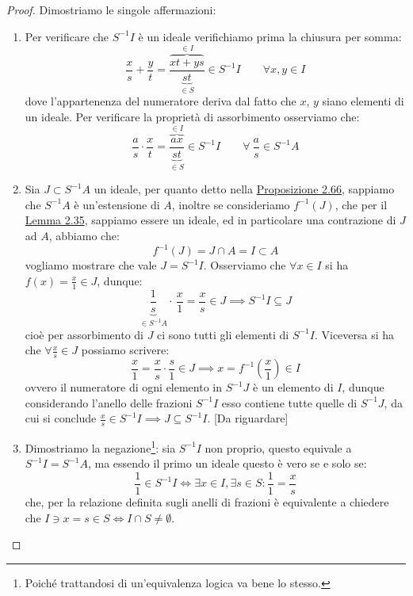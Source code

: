 \documentclass[11pt]{scrartcl}
\begin{document}
\begin{proof}
    Dimostriamo le singole affermazioni:
    \begin{enumerate}[(1)]
        \item Per verificare che $S^{-1}I$ è un ideale verifichiamo prima la chiusura per somma:
            \[ \frac{x}{s} + \frac{y}{t} = \frac{\overbrace{xt + ys}^{\in I}}{\underbrace{st}_{\in S}} \in S^{-1}I \qquad \forall x,y \in I
                \]
            dove l'appartenenza del numeratore deriva dal fatto che $x$, $y$ siano elementi di un ideale. Per verificare la proprietà di assorbimento osserviamo che:
            \[ \frac{a}{s} \cdot \frac{x}{t} = \frac{\overbrace{ax}^{\in I}}{\underbrace{st}_{\in S}} \in S^{-1}I \qquad \forall~\frac{a}{s} \in S^{-1}A 
                 \]
        \item Sia $J \subset S^{-1}A$ un ideale, per quanto detto nella \hyperref[2.66]{Proposizione 2.66}, sappiamo che $S^{-1}A$ è un'estensione di $A$, inoltre se consideriamo $f^{-1}(J)$, che per il \hyperref[2.35]{Lemma 2.35}, 
            sappiamo essere un ideale, ed in particolare una contrazione di $J$ ad $A$, abbiamo che:
            \[ f^{-1}(J) = J \cap A = I \subset A
                \]
            vogliamo mostrare che vale $J = S^{-1}I$. Osserviamo che $\forall x \in I$ si ha $\displaystyle f(x) = \frac{x}{1} \in J$, dunque:
            \[ \underbrace{\frac{1}{s}}_{\in S^{-1}A} \cdot \, \frac{x}{1} = \frac{x}{s} \in J \implies S^{-1}I \subseteq J
                \]
            cioè per assorbimento di $J$ ci sono tutti gli elementi di $S^{-1}I$. Viceversa si ha che $\displaystyle\forall \frac{x}{s} \in J$ possiamo scrivere:
            \[ \frac{x}{1} = \frac{x}{s}\cdot \frac{s}{1} \in J \implies x = f^{-1}\left(\frac{x}{1}\right) \in I
                \]
            ovvero il numeratore di ogni elemento in $S^{-1}J$ è un elemento di $I$, dunque considerando l'anello delle frazioni $S^{-1}I$ esso contiene tutte quelle di $S^{-1}J$, da cui si conclude $\displaystyle \frac{x}{s} \in S^{-1}I \implies J \subseteq S^{-1}I$. [Da riguardare]
        \item Dimostriamo la negazione\footnote{Poiché trattandosi di un'equivalenza logica va bene lo stesso.}: sia $S^{-1}I$ non proprio, questo equivale a $S^{-1}I = S^{-1}A$, ma essendo il primo un ideale questo è vero se e solo se:
            \[ \frac{1}{1} \in S^{-1}I \iff \exists x \in I, \exists s \in S : \frac{1}{1} = \frac{x}{s}
                \]
            che, per la relazione definita sugli anelli di frazioni è equivalente a chiedere che $I \ni x = s \in S \iff I \cap S \ne \emptyset$.

\end{enumerate}
\end{proof}
\end{document}

